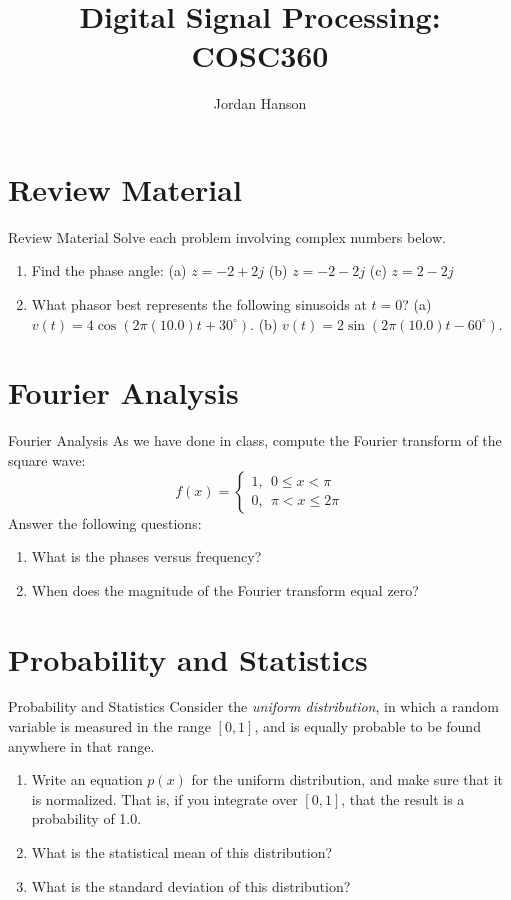 \documentclass{beamer}
\title{Digital Signal Processing: COSC360}
\author{Jordan Hanson}
\institute{Whittier College Department of Physics and Astronomy}
\begin{document}
\maketitle

\section{Review Material}

\begin{frame}{Review Material}
Solve each problem involving complex numbers below.
\begin{enumerate}
\item Find the phase angle: (a) $z = -2 + 2j$ (b) $z = -2 - 2j$ (c) $z = 2 - 2j$
\item What phasor best represents the following sinusoids at $t = 0$? (a) $v(t) = 4 \cos(2\pi (10.0) t + 30^{\circ})$. (b) $v(t) = 2 \sin(2\pi (10.0) t -60^{\circ})$.
\end{enumerate}
\end{frame}

\section{Fourier Analysis}

\begin{frame}{Fourier Analysis}
As we have done in class, compute the Fourier transform of the square wave:
\begin{equation}
f(x) = \begin{cases}
1, ~~ 0 \leq x < \pi \\
0, ~~ \pi < x \leq 2\pi
\end{cases}
\end{equation}
Answer the following questions:
\begin{enumerate}
\item What is the phases versus frequency?
\item When does the magnitude of the Fourier transform equal zero?
\end{enumerate}
\end{frame}

\section{Probability and Statistics}

\begin{frame}{Probability and Statistics}
Consider the \textit{uniform distribution}, in which a random variable is measured in the range $[0,1]$, and is equally probable to be found anywhere in that range.
\begin{enumerate}
\item Write an equation $p(x)$ for the uniform distribution, and make sure that it is normalized.  That is, if you integrate over $[0,1]$, that the result is a probability of 1.0.
\item What is the statistical mean of this distribution?
\item What is the standard deviation of this distribution?
\end{enumerate}
\end{frame}
\end{document}
